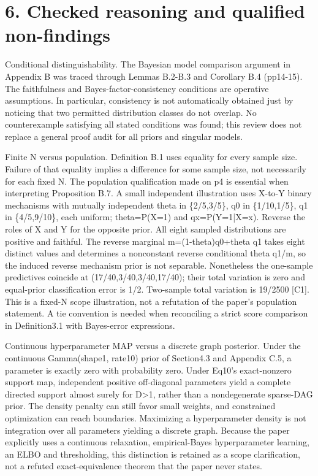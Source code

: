 \documentclass[10pt]{article}
\begin{document}
\section*{6. Checked reasoning and qualified non-findings}
Conditional distinguishability. The Bayesian model comparison argument in Appendix B was traced through Lemmas B.2-B.3 and Corollary B.4 (pp14-15). The faithfulness and Bayes-factor-consistency conditions are operative assumptions. In particular, consistency is not automatically obtained just by noticing that two permitted distribution classes do not overlap. No counterexample satisfying all stated conditions was found; this review does not replace a general proof audit for all priors and singular models.\par
Finite N versus population. Definition B.1 uses equality for every sample size. Failure of that equality implies a difference for some sample size, not necessarily for each fixed N. The population qualification made on p4 is essential when interpreting Proposition B.7. A small independent illustration uses X-to-Y binary mechanisms with mutually independent theta in \{2/5,3/5\}, q0 in \{1/10,1/5\}, q1 in \{4/5,9/10\}, each uniform; theta=P(X=1) and qx=P(Y=1|X=x). Reverse the roles of X and Y for the opposite prior. All eight sampled distributions are positive and faithful. The reverse marginal m=(1-theta)q0+theta q1 takes eight distinct values and determines a nonconstant reverse conditional theta q1/m, so the induced reverse mechanism prior is not separable. Nonetheless the one-sample predictives coincide at (17/40,3/40,3/40,17/40); their total variation is zero and equal-prior classification error is 1/2. Two-sample total variation is 19/2500 [C1]. This is a fixed-N scope illustration, not a refutation of the paper’s population statement. A tie convention is needed when reconciling a strict score comparison in Definition3.1 with Bayes-error expressions.\par
Continuous hyperparameter MAP versus a discrete graph posterior. Under the continuous Gamma(shape1, rate10) prior of Section4.3 and Appendix C.5, a parameter is exactly zero with probability zero. Under Eq10’s exact-nonzero support map, independent positive off-diagonal parameters yield a complete directed support almost surely for D>1, rather than a nondegenerate sparse-DAG prior. The density penalty can still favor small weights, and constrained optimization can reach boundaries. Maximizing a hyperparameter density is not integration over all parameters yielding a discrete graph. Because the paper explicitly uses a continuous relaxation, empirical-Bayes hyperparameter learning, an ELBO and thresholding, this distinction is retained as a scope clarification, not a refuted exact-equivalence theorem that the paper never states.\par
\end{document}
